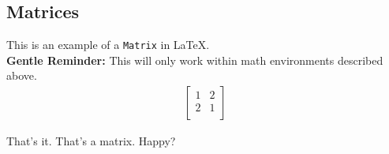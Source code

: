\documentclass{article}
\begin{document}
	\subsection{Matrices}
	This is an example of a {\tt Matrix} in \LaTeX.\\
	\textbf{Gentle Reminder: }This will only work within math environments described above.
	\begin{align*}	
		\left[
		\begin{matrix}
			1 & 2 \\
			2 & 1 \\
		\end{matrix}
		\right]
	\end{align*}
	
	That's it. That's a matrix. Happy?
	
\end{document}
